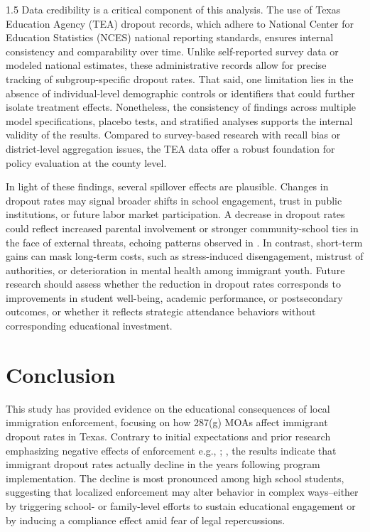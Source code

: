 \documentclass[12pt]{article}
\begin{document}
\begin{spacing}{1.5}
Data credibility is a critical component of this analysis. The use of Texas Education Agency (TEA) dropout records, which adhere to National Center for Education Statistics (NCES) national reporting standards, ensures internal consistency and comparability over time. Unlike self-reported survey data or modeled national estimates, these administrative records allow for precise tracking of subgroup-specific dropout rates. That said, one limitation lies in the absence of individual-level demographic controls or identifiers that could further isolate treatment effects. Nonetheless, the consistency of findings across multiple model specifications, placebo tests, and stratified analyses supports the internal validity of the results. Compared to survey-based research with recall bias or district-level aggregation issues, the TEA data offer a robust foundation for policy evaluation at the county level.

In light of these findings, several spillover effects are plausible. Changes in dropout rates may signal broader shifts in school engagement, trust in public institutions, or future labor market participation. A decrease in dropout rates could reflect increased parental involvement or stronger community-school ties in the face of external threats, echoing patterns observed in \citet{suarez2010}. In contrast, short-term gains can mask long-term costs, such as stress-induced disengagement, mistrust of authorities, or deterioration in mental health among immigrant youth. Future research should assess whether the reduction in dropout rates corresponds to improvements in student well-being, academic performance, or postsecondary outcomes, or whether it reflects strategic attendance behaviors without corresponding educational investment.

\section{Conclusion}
This study has provided evidence on the educational consequences of local immigration enforcement, focusing on how 287(g) MOAs affect immigrant dropout rates in Texas. Contrary to initial expectations and prior research emphasizing negative effects of enforcement e.g., \citet{amuedo2015}; \citet{dee2020}, the results indicate that immigrant dropout rates actually decline in the years following program implementation. The decline is most pronounced among high school students, suggesting that localized enforcement may alter behavior in complex ways–either by triggering school- or family-level efforts to sustain educational engagement or by inducing a compliance effect amid fear of legal repercussions.


\end{spacing}
\end{document}
